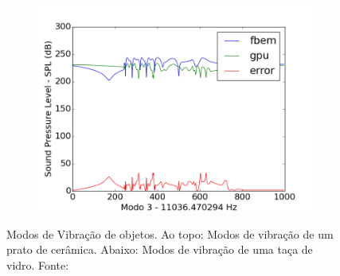\begin{figure}[ht]
\begin{subfigure}{0.5\textwidth}
	\includegraphics[width=\textwidth]{../data/transfer_test/steel_key/plots/steel_key-tfv-0_3.png}
	\label{fig:coef_key_3}
\end{subfigure}
\caption[Modos de Vibração de objetos]{Modos de Vibração de objetos. Ao topo: Modos de vibração de um prato de cerâmica. Abaixo: Modos de vibração de uma taça de vidro. Fonte: \cite{langlois2014eigenmode}}
\label{fig:coef_key}
\end{figure}

